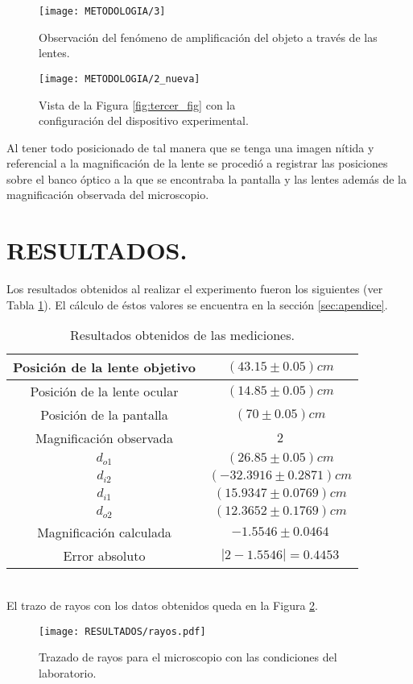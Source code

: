 \documentclass[10pt,a4paper]{article}
\begin{document}
\begin{figure}[ht]
\begin{minipage}{0.5\linewidth}
	\texttt{[image: METODOLOGIA/3]}
	\caption{Observación del fenómeno de amplificación del objeto a través de las lentes.}
	\label{fig:cuarta_fig}
\end{minipage}\hspace{5mm}
\begin{minipage}{0.5\linewidth}
	\texttt{[image: METODOLOGIA/2\_nueva]}
	\caption{Vista de la Figura \ref{fig:tercer_fig} con la\\configuración del dispositivo experimental.}
	\label{fig:quinta_fig}
\end{minipage}
\end{figure}
Al tener todo posicionado de tal manera que se tenga una imagen nítida y referencial a la magnificación de la lente se procedió a registrar las posiciones sobre el banco óptico a la que se encontraba la pantalla y las lentes además de la magnificación observada del microscopio.

\newpage

\section{RESULTADOS.} %
Los resultados obtenidos al realizar el experimento fueron los siguientes (ver Tabla \ref{tab:resultados}). El cálculo de éstos valores se encuentra en la sección \ref{sec:apendice}.
\begin{table}[ht]
\centering
\caption{Resultados obtenidos de las mediciones.}
\begin{tabular}{|c|c|}
	\hline
	Posición de la lente objetivo & $ (43.15\pm0.05)cm $ \\ 	\hline
	Posición de la lente ocular & $ (14.85\pm0.05)cm $  \\ 	\hline
	Posición de la pantalla & $ (70\pm0.05) cm $  \\ 	\hline
	Magnificación observada & $ 2 $ \\ 	\hline
	$d_{o1}$ & $ (26.85\pm 0.05) cm $  \\ 	\hline
	$d_{i2}$ & $ (-32.3916\pm 0.2871) cm $ \\ 	\hline
	$d_{i1} $ & $ (15.9347\pm0.0769)cm $  \\ 	\hline
	$d_{o2}$ & $ (12.3652\pm0.1769)cm $  \\ 	\hline
	Magnificación calculada & $ -1.5546\pm0.0464 $  \\ 	\hline
	Error absoluto &  $ |2-1.5546|=0.4453 $\\ 	\hline
\end{tabular}
	\label{tab:resultados}
\end{table}\\
El trazo de rayos con los datos obtenidos queda en la Figura \ref{fig:rayos}.
\begin{figure}[ht]
	\centering
	\texttt{[image: RESULTADOS/rayos.pdf]}
	\caption{Trazado de rayos para el microscopio con las condiciones del laboratorio.}
	\label{fig:rayos}
\end{figure}
\end{document}
